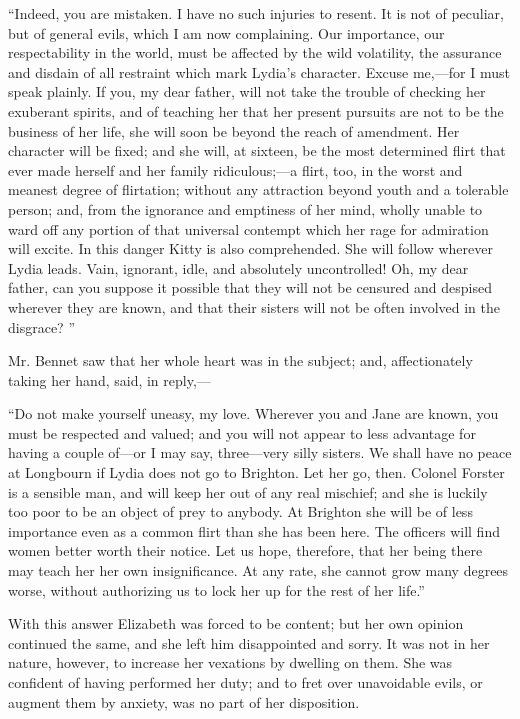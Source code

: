 \documentclass[10pt]{book}
\begin{document}
   “Indeed, you are mistaken. I have no such injuries to resent. It is not
of peculiar, but of general evils, which I am now complaining. Our
importance, our respectability in the world, must be affected by the
wild volatility, the assurance and disdain of all restraint which mark
Lydia’s character. Excuse me,—for I must speak plainly. If you, my dear
father, will not take the trouble of checking her exuberant spirits, and
of teaching her that her present pursuits are not to be the business of
her life, she will soon be beyond the reach of amendment. Her character
will be fixed; and she will, at sixteen, be the most determined flirt
that ever made herself and her family ridiculous;—a flirt, too, in the
worst and meanest degree of flirtation; without any attraction beyond
youth and a tolerable person; and, from the ignorance and emptiness of
her mind, wholly unable to ward off any portion of that universal
contempt which her rage for admiration will excite. In this danger Kitty
is also comprehended. She will follow wherever Lydia leads. Vain,
ignorant, idle, and absolutely uncontrolled! Oh, my dear father, can you
suppose it possible that they will not be censured and despised wherever
they are known, and that their sisters will not be often involved in the
disgrace?
   ”
  

   Mr. Bennet saw that her whole heart was in the subject; and,
affectionately taking her hand, said, in reply,—
  

   “Do not make yourself uneasy, my love. Wherever you and Jane are known,
you must be respected and valued; and you will not appear to less
advantage for having a couple of—or I may say, three—very silly
sisters. We shall have no peace at Longbourn if Lydia does not go to
Brighton. Let her go, then. Colonel Forster is a sensible man, and will
keep her out of any real mischief; and she is luckily too poor to be an
object of prey to anybody. At Brighton she will be of less importance
even as a common flirt than she has been here. The officers will find
women better worth their notice. Let us hope, therefore, that her being
there may teach her her own insignificance. At any rate, she cannot grow
many degrees worse, without authorizing us to lock her up for the rest
of her life.”
  

   With this answer Elizabeth was forced to be content; but her own opinion
continued the same, and she left him disappointed and sorry. It was not
in her nature, however, to increase her vexations by dwelling on them.
She was confident of having performed her duty; and to fret over
unavoidable evils, or augment them by anxiety, was no part of her
disposition.
  
\end{document}
